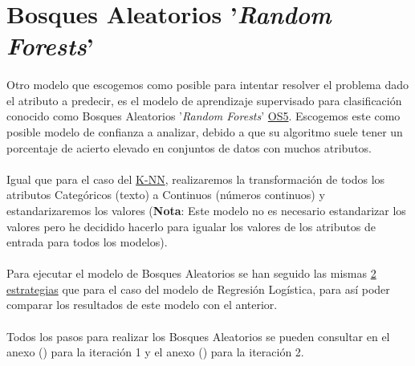 \section{Bosques Aleatorios '\textit{Random Forests}'}
\label{section:rf}

\paragraph{}
Otro modelo que escogemos como posible para intentar resolver el problema dado el atributo a predecir, es el modelo de aprendizaje supervisado para clasificación conocido como Bosques Aleatorios '\textit{Random Forests}'\cite{ref:rf_def} \hyperref[os:OS5]{OS5}. Escogemos este como posible modelo de confianza a analizar, debido a que su algoritmo suele tener un porcentaje de acierto elevado en conjuntos de datos con muchos atributos.

\paragraph{}
Igual que para el caso del \hyperref[section:knn]{K-NN}, realizaremos la transformación de todos los atributos Categóricos (texto) a Continuos (números continuos) y estandarizaremos los valores (\textbf{Nota}: Este modelo no es necesario estandarizar los valores pero he decidido hacerlo para igualar los valores de los atributos de entrada para todos los modelos).

\paragraph{}
Para ejecutar el modelo de Bosques Aleatorios se han seguido las mismas \hyperref[section:lr_casos]{2 estrategias} que para el caso del modelo de Regresión Logística, para así poder comparar los resultados de este modelo con el anterior.

\paragraph{}
Todos los pasos para realizar los Bosques Aleatorios se pueden consultar en el anexo () para la iteración 1 y el anexo () para la iteración 2.

